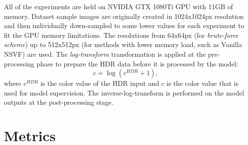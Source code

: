 All of the experiments are held on NVIDIA GTX 1080Ti GPU with 11GB of memory.
Dataset sample images are originally created in 1024x1024px resolution
and then individually down-sampled to some lower values for each experiment to fit the GPU memory limitations.
The resolutions from 64x64px (for \textit{brute-force scheme}) up to 512x512px 
(for methods with lower memory load, such as Vanilla NSVF) are used.
The \textit{log-transform} transformation is applied at the pre-processing phase
to prepare the HDR data before it is processed by the model:
\begin{equation}
    c = \log (c^{HDR} + 1),
\end{equation}
where $c^{HDR}$ is the color value of the HDR input
and $c$ is the color value that is used for model supervision.
The inverse-log-transform is performed on the model outputs at the post-processing stage.









\section{Metrics}
\label{sec:metrics}

